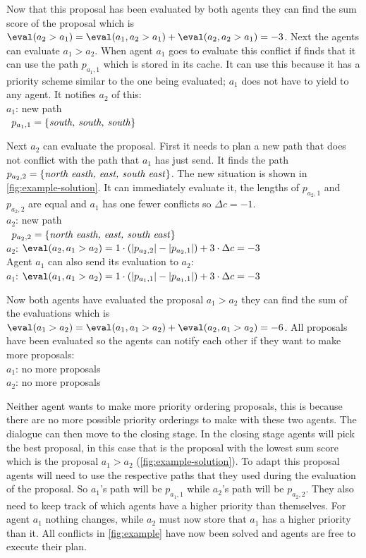 Now that this proposal has been evaluated by both agents they can find the sum
score of the proposal which is $\eval(a_2 > a_1) = \eval(a_1, a_2 > a_1) +
\eval(a_2, a_2 > a_1) =
-3$. Next the agents can evaluate $a_1 > a_2$. When agent $a_1$ goes to
evaluate this conflict if finds that it can use the path $p_{a_1,1}$ which is
stored in its cache. It can use this because it has a priority scheme similar
to the one being evaluated; $a_1$ does not have to yield to any agent. It
notifies $a_2$ of this:
\\ \-\qquad $a_1$: new path
\\ \-\qquad\quad\,\; $p_{a_1,1} = \{\text{\emph{south, south, south}}\}$

Next $a_2$ can evaluate the proposal. First it needs to plan a new path that
does not conflict with the path that $a_1$ has just send. It finds the path
$p_{a_2,2} = \{\text{\emph{north easth, east, south east}}\}$. The new
situation is shown in \autoref{fig:example-solution}. It can
immediately evaluate it, the lengths of $p_{a_2,1}$ and $p_{a_2,2}$ are equal
and $a_1$ has one fewer conflicts so $\Delta c = -1$.
\\ \-\qquad $a_2$: new path
\\ \-\qquad\quad\,\; $p_{a_2,2} = \{\text{\emph{north easth, east, south
east}}\}$
\\ \-\qquad $a_2$: $\eval(a_2, a_1 > a_2) = 1 \cdot (|p_{a_2,2}| - |p_{a_2,1}|)
+ 3 \cdot \Delta c = -3$
\\ Agent $a_1$ can also send its evaluation to $a_2$:
\\ \-\qquad $a_1$: $\eval(a_1, a_1 > a_2) = 1 \cdot (|p_{a_1,1}| - |p_{a_1,1}|)
+ 3 \cdot \Delta c = -3$

Now both agents have evaluated the proposal $a_1 > a_2$ they can find the sum
of the evaluations which is $\eval(a_1 > a_2) = \eval(a_1, a_1 > a_2) +
\eval(a_2, a_1 > a_2) =
-6$. All proposals have been evaluated so the agents can notify each other if
they want to make more proposals:
\\ \- \quad $a_1$: no more proposals
\\ \- \quad $a_2$: no more proposals

Neither agent wants to make more priority ordering proposals, this is because
there are no more possible priority orderings to make with these two agents.
The dialogue can then move to the closing stage. In the closing stage agents
will pick the best proposal, in this case that is the proposal with the lowest
sum score which is the proposal $a_1 > a_2$ (\autoref{fig:example-solution}). 
To adapt this proposal agents will
need to use the respective paths that they used during the evaluation of the
proposal. So $a_1$'s path will be $p_{a_1,1}$ while $a_2$'s path will be
$p_{a_2,2}$. They also need to keep track of which agents have a higher
priority than themselves. For agent $a_1$ nothing changes, while $a_2$ must now
store that $a_1$ has a higher priority than it. All conflicts in
\autoref{fig:example} have now been solved and agents are free to execute their
plan.

